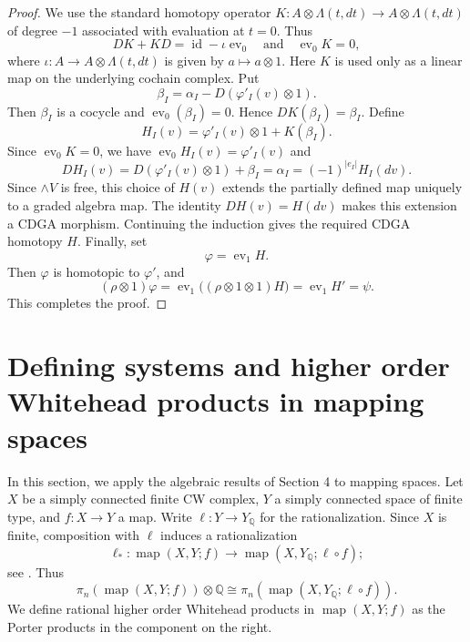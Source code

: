 \documentclass[a4paper,10pt]{amsart}
\theoremstyle{definition}
\theoremstyle{remark}
\newcommand{\map}{\operatorname{map}}
\newcommand{\ev}{\operatorname{ev}}
\numberwithin{equation}{section}
\begin{document}
\begin{proof}
We use the standard
homotopy operator
$
K:A\otimes\Lambda(t,dt)\to A\otimes\Lambda(t,dt)
$
of degree $-1$ associated with evaluation at $t=0$. Thus
\[
        DK+KD=\operatorname{id}-\iota\operatorname{ev}_0
        \quad
        \text{and}
        \quad
        \operatorname{ev}_0K=0,
\]
where $\iota:A\to A\otimes\Lambda(t,dt)$ is given by $a\mapsto a\otimes 1$.
Here $K$ is used only as a linear map on the underlying cochain complex.
Put
\[
        \beta_I=\alpha_I-D(\varphi'_I(v)\otimes 1).
\]
Then $\beta_I$ is a cocycle and $\ev_0(\beta_I)=0$. Hence
$DK(\beta_I)=\beta_I$. Define
\[
H_I(v)
=
\varphi'_I(v)\otimes 1
+
K(\beta_I).
\]
Since $\ev_0K=0$, we have
$
\operatorname{ev}_0H_I(v)=\varphi'_I(v)
$
and
\[
        DH_I(v)
        =
        D(\varphi'_I(v)\otimes 1)+\beta_I
        =
        \alpha_I
        =
        (-1)^{|e_I|}H_I(dv).
\]
Since $\wedge V$ is free, this choice of $H(v)$ extends the partially defined
map uniquely to a graded algebra map.
The identity
$DH(v)=H(dv)$ makes this extension a CDGA morphism.
Continuing the
induction gives the required CDGA homotopy $H$.
Finally, set
\[
        \varphi=\ev_1 H.
\]
Then $\varphi$ is homotopic to $\varphi'$, and
\[
(\rho\otimes 1)\varphi
=
\ev_1 \bigl((\rho\otimes 1\otimes 1)H\bigr)
=
\ev_1 H'
=
\psi.
\]
This completes the proof.
\end{proof}





\section{Defining systems and higher order Whitehead products in mapping spaces}

In this section, we apply the algebraic results of Section 4 to mapping spaces.
Let $X$ be a simply connected finite CW complex, $Y$ a simply connected
space of finite type, and $f\colon X\to Y$ a map. Write
$
        \ell : Y\longrightarrow Y_{\mathbb Q}
$
for the rationalization. Since $X$ is finite, composition with $\ell$ induces a
rationalization
\[
\ell_*:
\map(X,Y;f)
\longrightarrow
\map(X,Y_{\mathbb Q};\ell\circ f);
\]
see \cite[Chapter~II, Theorem~3.11 and the following paragraph]{HMR1975}.
Thus
\[
\pi_n(\map(X,Y;f))\otimes\mathbb Q
\cong
\pi_n(\map(X,Y_{\mathbb Q};\ell\circ f)).
\]
We define rational higher order Whitehead products in $\map(X,Y;f)$ as the
Porter products in the component on the right.
\end{document}
